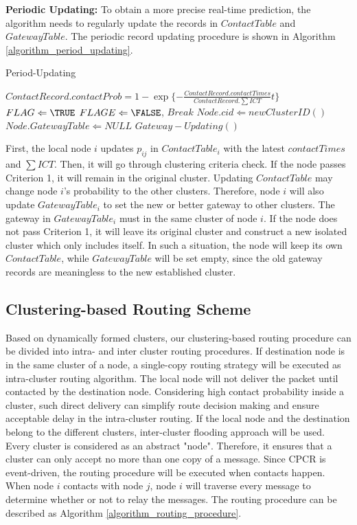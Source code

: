 \documentclass[conference]{IEEEtran}
\begin{document}
\smallskip
\textbf{Periodic Updating:}
To obtain a more precise real-time prediction, the algorithm needs to regularly update the records in $ContactTable$ and $GatewayTable$. The periodic record updating procedure is shown in Algorithm \ref{algorithm_period_updating}.

\begin{algorithm}[!t]
\caption{Period-Updating}\label{algorithm_period_updating}
\begin{algorithmic}
\STATE $ContactRecord.contactProb =1-\exp\{-\frac{ContactRecord.contactTimes}{ContactRecord.\sum ICT}t\}$
\ENDFOR
{}
\STATE $FLAG \Leftarrow \TRUE$
\STATE $FLAGE \Leftarrow \FALSE$, $Break$
\ENDIF
{}
\STATE $Node.cid \Leftarrow newClusterID()$
\STATE $Node.GatewayTable \Leftarrow NULL$
\ELSE
\STATE $Gateway-Updating()$
\ENDIF
\ENDFOR
\end{algorithmic}
\end{algorithm}

First, the local node $i$ updates $p_{ij}$ in $ContactTable_i$ with the latest $contactTimes$ and $\sum ICT$.
Then, it will go through clustering criteria check. If the node passes Criterion 1, it will remain in the original cluster.
Updating $ContactTable$ may change node $i$'s probability to the other clusters. Therefore, node $i$ will also update $GatewayTable_i$ to set the new or better gateway to other clusters. The gateway in $GatewayTable_i$ must in the same
cluster of node $i$. If the node does not pass Criterion 1, it will leave its original cluster and construct a new isolated cluster
which only includes itself. In such a situation, the node will keep its own $ContactTable$, while $GatewayTable$ will be set empty, since the old gateway records are meaningless to the new established cluster.

\subsection{Clustering-based Routing Scheme}
\label{section_label_routing_procedure}
Based on dynamically formed clusters, our clustering-based routing procedure can be divided into intra- and inter cluster routing procedures. If destination node is in the same cluster of a node, a single-copy routing strategy will be executed as intra-cluster routing algorithm. The local node will not deliver the packet until contacted by the destination node. Considering high contact probability inside a cluster, such direct delivery can simplify route decision making and ensure acceptable delay in the intra-cluster routing.
If the local node and the destination belong to the different clusters, inter-cluster flooding approach will be used. Every cluster is considered as an abstract "node". Therefore, it ensures that a cluster can only accept no more than one copy of a message.
Since CPCR is event-driven, the routing procedure will be executed when contacts happen. When node $i$ contacts with node $j$, node $i$ will traverse every message to determine whether or not to relay the messages. The routing procedure can be described as Algorithm \ref{algorithm_routing_procedure}.
\end{document}

